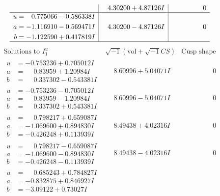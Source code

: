 \documentclass[1p]{elsarticle_modified}
\theoremstyle{definition}
\newcommand{\I}{\sqrt{-1}}
\begin{document}
$$\begin{array}{c|c|c}
 & \phantom{-}4.30200 + 4.87126 I & \phantom{-0.000000 } 0 \\ \hline\begin{aligned}
u &= \phantom{-}0.775066 - 0.586338 I \\
a &= -1.116910 - 0.569471 I \\
b &= -1.122590 + 0.417819 I\end{aligned}
 & \phantom{-}4.30200 - 4.87126 I & \phantom{-0.000000 } 0\\
 \hline 
 \end{array}$$\newpage$$\begin{array}{c|c|c}  
\text{Solutions to }I^u_{1}& \I (\text{vol} + \sqrt{-1}CS) & \text{Cusp shape}\\
 \hline 
\begin{aligned}
u &= -0.753236 + 0.705012 I \\
a &= \phantom{-}0.83959 + 1.20984 I \\
b &= \phantom{-}0.337302 - 0.543381 I\end{aligned}
 & \phantom{-}8.60996 + 5.04071 I & \phantom{-0.000000 } 0 \\ \hline\begin{aligned}
u &= -0.753236 - 0.705012 I \\
a &= \phantom{-}0.83959 - 1.20984 I \\
b &= \phantom{-}0.337302 + 0.543381 I\end{aligned}
 & \phantom{-}8.60996 - 5.04071 I & \phantom{-0.000000 } 0 \\ \hline\begin{aligned}
u &= \phantom{-}0.798217 + 0.659087 I \\
a &= -1.069600 + 0.894830 I \\
b &= -0.426248 + 0.113939 I\end{aligned}
 & \phantom{-}8.49438 + 4.02316 I & \phantom{-0.000000 } 0 \\ \hline\begin{aligned}
u &= \phantom{-}0.798217 - 0.659087 I \\
a &= -1.069600 - 0.894830 I \\
b &= -0.426248 - 0.113939 I\end{aligned}
 & \phantom{-}8.49438 - 4.02316 I & \phantom{-0.000000 } 0 \\ \hline\begin{aligned}
u &= \phantom{-}0.685243 + 0.784827 I \\
a &= -0.832875 + 0.846927 I \\
b &= -3.09122 + 0.73027 I\end{aligned}

\end{array}$$
\end{document}
